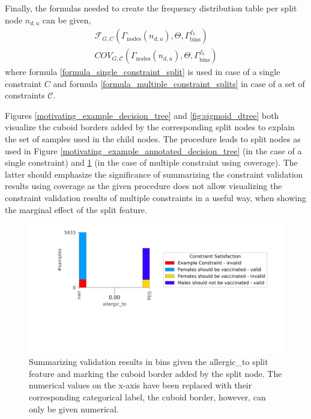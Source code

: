 Finally, the formulas needed to create the frequency distribution table per split node $n_{d,u}$ can be given, 
\begin{gather}
    \mathcal{F}_{G,C}(\Gamma_\text{nodes}(n_{d,u}),\Theta, \Gamma_\text{bins}^{f_k}) \label{formula_single_constraint_split}\\
    COV_{G,\mathcal{C}}(\Gamma_\text{nodes}(n_{d,u}),\Theta,\Gamma_\text{bins}^{f_k}) \label{formula_multiple_constraint_splits}
\end{gather}
where formula \ref{formula_single_constraint_split} is used in case of a single constraint $C$ and formula \ref{formula_multiple_constraint_splits} in case of a set of constraints $\mathcal{C}$. 

Figures \ref{motivating_example_decision_tree} and \ref{fig:sigmoid_dtree} both visualize the cuboid borders added by the corresponding split nodes to explain the set of samples used in the child nodes. The procedure leads to split nodes as used in Figure \ref{motivating_example_annotated_decision_tree} (in the case of a single constraint) and \ref{fig:decision_tree_split_node_marginal_effect_viz} (in the case of multiple constraint using coverage). The latter should emphasize the significance of summarizing the constraint validation results using coverage as the given procedure does not allow visualizing the constraint validation results of multiple constraints in a useful way, when showing the marginal effect of the split feature.

\begin{figure}
    \centering
    \includegraphics[trim=400 600 0 0, width=\textwidth]{images/visualizations/marginal_effect_split_node.png}  
    \caption{Summarizing validation results in bins given the allergic\_to split feature and marking the cuboid border added by the split node. The numerical values on the x-axis have been replaced with their corresponding categorical label, the cuboid border, however, can only be given numerical.}
    \label{fig:decision_tree_split_node_marginal_effect_viz}
\end{figure}



